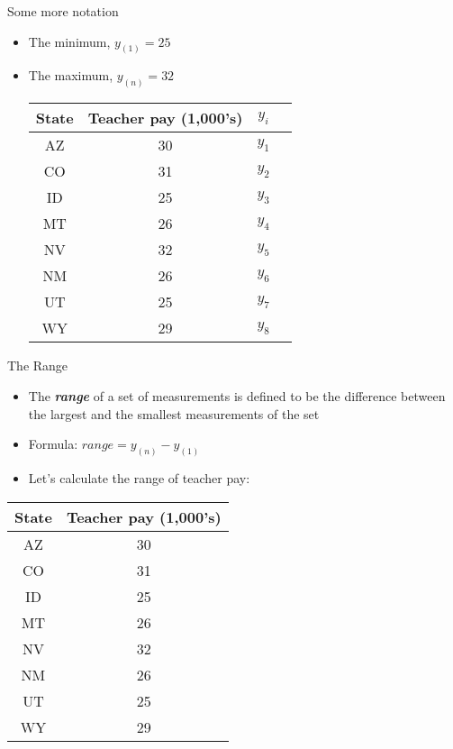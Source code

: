 \documentclass[xcolor=dvipsnames]{beamer}
\begin{document}
\begin{frame}{Some more notation}
	\vspace{-5pt}
	\begin{itemize}
		\item The minimum, $y_{(1)} = 25$
		\item The maximum, $y_{(n)} = 32$
		\vspace{5 pt}
		\begin{center}
			\begin{tabular}{|c|c|c|c|}
				\hline 
				\textbf{State} & \textbf{Teacher pay (1,000's)} & $y_i$ \\ 
				\hline \hline
				AZ & 30 & $y_1$\\ \hline 
				CO &  31 & $y_2$ \\ \hline 
				ID & 25 & $y_3$ \\  \hline 
				MT &  26 & $y_4$ \\ \hline 
				NV & 32 & $y_5$ \\ \hline 
				NM &  26 & $y_6$\\ \hline 
				UT &  25 & $y_7$\\ \hline 
				WY &  29 & $y_8$\\ \hline 
			\end{tabular} 
		\end{center}
	\end{itemize}
\end{frame}

\begin{frame}{The Range}
	\begin{itemize}
		\item The \textbf{\emph{range}} of a set of measurements is defined to be the difference between the largest and the smallest measurements of the set
		\item Formula: $range = y_{(n)} - y_{(1)}$
		\item Let's calculate the range of teacher pay:
	\end{itemize}
	\begin{center}
		\begin{tabular}{|c|c|}
			\hline 
			\textbf{State} & \textbf{Teacher pay (1,000's)} \\ 
			\hline \hline
			AZ & 30 \\ \hline 
			CO &  31 \\ \hline 
			ID & 25  \\  \hline 
			MT &  26 \\ \hline 
			NV & 32 \\ \hline 
			NM &  26 \\ \hline 
			UT &  25 \\ \hline 
			WY &  29 \\ \hline 
		\end{tabular} 
	\end{center}
\end{frame}
\end{document}

